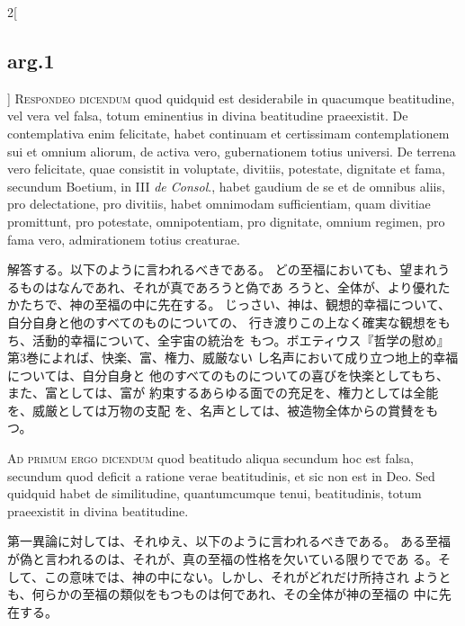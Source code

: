 \documentclass[paper=a4paper,fontsize=10pt,jafontsize=9pt,titlepage]{jlreq}
\begin{document}
\begin{paracol}{2}[\subsection{arg.1}]
{\scshape Respondeo dicendum} quod quidquid est desiderabile in quacumque
beatitudine, vel vera vel falsa, totum eminentius in divina beatitudine
praeexistit. De contemplativa enim felicitate, habet continuam et
certissimam contemplationem sui et omnium aliorum, de activa vero,
gubernationem totius universi. De terrena vero felicitate, quae
consistit in voluptate, divitiis, potestate, dignitate et fama, secundum
Boetium, in III {\itshape de Consol}., habet gaudium de se et de omnibus aliis, pro
delectatione, pro divitiis, habet omnimodam sufficientiam, quam divitiae
promittunt, pro potestate, omnipotentiam, pro dignitate, omnium regimen,
pro fama vero, admirationem totius creaturae.

\switchcolumn

解答する。以下のように言われるべきである。
どの至福においても、望まれうるものはなんであれ、それが真であろうと偽であ
 ろうと、全体が、より優れたかたちで、神の至福の中に先在する。
じっさい、神は、観想的幸福について、自分自身と他のすべてのものについての、
 行き渡りこの上なく確実な観想をもち、活動的幸福について、全宇宙の統治を
 もつ。ボエティウス『哲学の慰め』第3巻によれば、快楽、富、権力、威厳ない
 し名声において成り立つ地上的幸福については、自分自身と
 他のすべてのものについての喜びを快楽としてもち、また、富としては、富が
約束するあらゆる面での充足を、権力としては全能を、威厳としては万物の支配
 を、名声としては、被造物全体からの賞賛をもつ。

\switchcolumn*[\subsection{ad.1}]

{\scshape Ad primum ergo dicendum} quod beatitudo aliqua secundum hoc est falsa,
secundum quod deficit a ratione verae beatitudinis, et sic non est in
Deo. Sed quidquid habet de similitudine, quantumcumque tenui,
beatitudinis, totum praeexistit in divina beatitudine.

\switchcolumn

第一異論に対しては、それゆえ、以下のように言われるべきである。
ある至福が偽と言われるのは、それが、真の至福の性格を欠いている限りでであ
 る。そして、この意味では、神の中にない。しかし、それがどれだけ所持され
 ようとも、何らかの至福の類似をもつものは何であれ、その全体が神の至福の
 中に先在する。

\switchcolumn*[\subsection{ad.2}]


\end{paracol}
\end{document}
